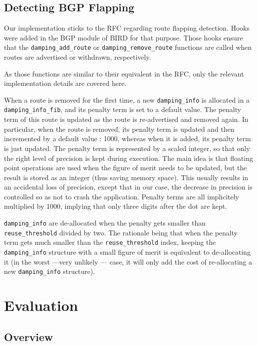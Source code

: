 \documentclass[a4paper,english]{IEEEtran}
\begin{document}
\subsection{Detecting BGP Flapping}

Our implementation sticks to the RFC regarding route flapping detection.
Hooks were added in the BGP module of BIRD for that purpose.
Those hooks ensure that the {\tt\small damping\_add\_route} or 
{\tt\small damping\_remove\_route} functions are 
called when routes are advertised or withdrawn, respectively.

As those functions are similar to their equivalent in the RFC, only the relevant
implementation details are covered here.

When a route is removed for the first time, a new {\tt\small damping\_info} 
is allocated in a {\tt\small damping\_info\_fib}, and its penalty term is set to 
a default value. The penalty term of this route is updated as the route is re-advertised
and removed again. In particular, when the route is removed, its penalty term is
updated and then incremented by a default value : 1000, whereas when it is added,
its penalty term is just updated. The penalty term is represented by a scaled integer,
so that only the right level of precision is kept during execution.
The main idea is that floating point operations are used when the figure of merit needs
to be updated, but the result is stored as an integer (thus saving memory space).
This usually results in an accidental loss of precision, except that in our case,
the decrease in precision is controlled so as not to crash the application. 
Penalty terms are all implicitely multiplied by 1000, implying that only three digits 
after the dot are kept.

{\tt\small damping\_info} are de-allocated when the penalty gets smaller than
{\tt\small reuse\_threshold} divided by two. The rationale being that when the penalty
term gets much smaller than the {\tt\small reuse\_threshold} index, keeping the 
{\tt\small damping\_info} structure with a small figure of merit is equivalent to de-allocating it 
(in the worst ---very unlikely --- case, it will only add the cost of re-allocating a 
new {\tt\small damping\_info} structure).

\section{Evaluation}

\subsection{Overview}
\end{document}
